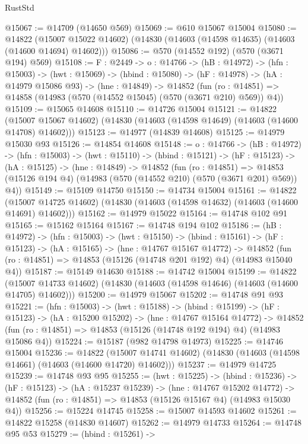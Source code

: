 \begin{lexlean}{RustStd}
\begin{coremodule}
@15067 := @14709 (@14650 @569)
@15069 := @610 @15067 @15004
@15080 := @14822
    (@15007 @15022 @14602)
    (@14830 (@14603 (@14598 @14635) (@14603 (@14600 @14694) @14602)))
@15086 := @570 (@14552 @192) (@570 (@3671 @194) @569)
@15108 := {F : @2449} ->
  {o : @14766} ->
  (hB : @14972) ->
  (hfn : @15003) ->
  (hwt : @15069) ->
  (hbind : @15080) ->
  (hF : @14978) ->
  (hA : @14979 @15086 @93) ->
  (hne : @14849) ->
  @14852 (fun (ro : @14851) => @14858 (@14983 (@570 (@14552 @15045) (@570 (@3671 @210) @569)) @4))
@15109 := @15065 @14608
@15110 := @14726 @15004
@15121 := @14822
    (@15007 @15067 @14602)
    (@14830 (@14603 (@14598 @14649) (@14603 (@14600 @14708) @14602)))
@15123 := @14977 (@14839 @14608)
@15125 := @14979 @15030 @93
@15126 := @14854 @14608
@15148 := {o : @14766} ->
  (hB : @14972) ->
  (hfn : @15003) ->
  (hwt : @15110) ->
  (hbind : @15121) ->
  (hF : @15123) ->
  (hA : @15125) ->
  (hne : @14849) ->
  @14852
    (fun (ro : @14851) =>
    @14853 (@15126 @194 @4) (@14983 (@570 (@14552 @210) (@570 (@3671 @201) @569)) @4))
@15149 := @15109 @14750
@15150 := @14734 @15004
@15161 := @14822
    (@15007 @14725 @14602)
    (@14830 (@14603 (@14598 @14632) (@14603 (@14600 @14691) @14602)))
@15162 := @14979 @15022
@15164 := @14748 @102 @91
@15165 := @15162 @15164
@15167 := @14748 @194 @102
@15186 := (hB : @14972) ->
  (hfn : @15003) ->
  (hwt : @15150) ->
  (hbind : @15161) ->
  (hF : @15123) ->
  (hA : @15165) ->
  (hne : @14767 @15167 @14772) ->
  @14852 (fun (ro : @14851) => @14853 (@15126 (@14748 @201 @192) @4) (@14983 @15040 @4))
@15187 := @15149 @14630
@15188 := @14742 @15004
@15199 := @14822
    (@15007 @14733 @14602)
    (@14830 (@14603 (@14598 @14646) (@14603 (@14600 @14705) @14602)))
@15200 := @14979 @15067
@15202 := @14748 @91 @93
@15221 := (hfn : @15003) ->
  (hwt : @15188) ->
  (hbind : @15199) ->
  (hF : @15123) ->
  (hA : @15200 @15202) ->
  (hne : @14767 @15164 @14772) ->
  @14852 (fun (ro : @14851) => @14853 (@15126 (@14748 @192 @194) @4) (@14983 @15086 @4))
@15224 := @15187 (@982 @14798 @14973)
@15225 := @14746 @15004
@15236 := @14822
    (@15007 @14741 @14602)
    (@14830 (@14603 (@14598 @14661) (@14603 (@14600 @14720) @14602)))
@15237 := @14979 @14725
@15239 := @14748 @93 @95
@15255 := (hwt : @15225) ->
  (hbind : @15236) ->
  (hF : @15123) ->
  (hA : @15237 @15239) ->
  (hne : @14767 @15202 @14772) ->
  @14852 (fun (ro : @14851) => @14853 (@15126 @15167 @4) (@14983 @15030 @4))
@15256 := @15224 @14745
@15258 := @15007 @14593 @14602
@15261 := @14822 @15258 (@14830 @14607)
@15262 := @14979 @14733
@15264 := @14748 @95 @53
@15279 := (hbind : @15261) ->

\end{coremodule}
\end{lexlean}
